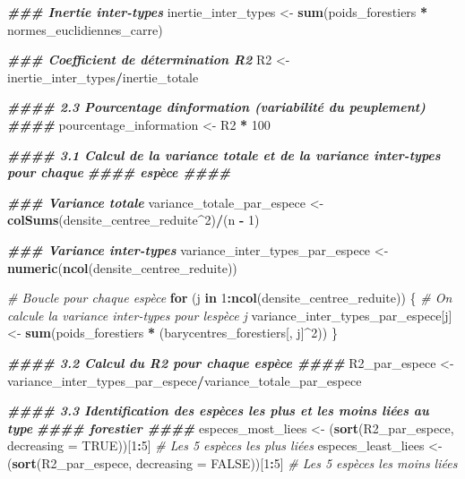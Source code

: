 \documentclass[
]{article}
\newenvironment{Shaded}{\begin{snugshade}}{\end{snugshade}}
\newcommand{\AttributeTok}[1]{\textcolor[rgb]{0.13,0.29,0.53}{#1}}
\newcommand{\CommentTok}[1]{\textcolor[rgb]{0.56,0.35,0.01}{\textit{#1}}}
\newcommand{\ConstantTok}[1]{\textcolor[rgb]{0.56,0.35,0.01}{#1}}
\newcommand{\ControlFlowTok}[1]{\textcolor[rgb]{0.13,0.29,0.53}{\textbf{#1}}}
\newcommand{\DecValTok}[1]{\textcolor[rgb]{0.00,0.00,0.81}{#1}}
\newcommand{\DocumentationTok}[1]{\textcolor[rgb]{0.56,0.35,0.01}{\textbf{\textit{#1}}}}
\newcommand{\FunctionTok}[1]{\textcolor[rgb]{0.13,0.29,0.53}{\textbf{#1}}}
\newcommand{\NormalTok}[1]{#1}
\newcommand{\OtherTok}[1]{\textcolor[rgb]{0.56,0.35,0.01}{#1}}
\newcommand{\SpecialCharTok}[1]{\textcolor[rgb]{0.81,0.36,0.00}{\textbf{#1}}}
\begin{document}
\begin{Shaded}
\begin{Highlighting}[]
\DocumentationTok{\#\#\# Inertie inter{-}types}
\NormalTok{inertie\_inter\_types }\OtherTok{\textless{}{-}} \FunctionTok{sum}\NormalTok{(poids\_forestiers }\SpecialCharTok{*}\NormalTok{ normes\_euclidiennes\_carre)}

\DocumentationTok{\#\#\# Coefficient de détermination R2}
\NormalTok{R2 }\OtherTok{\textless{}{-}}\NormalTok{ inertie\_inter\_types}\SpecialCharTok{/}\NormalTok{inertie\_totale}

\DocumentationTok{\#\#\#\# 2.3 Pourcentage d\textquotesingle{}information (variabilité du peuplement) \#\#\#\#}
\NormalTok{pourcentage\_information }\OtherTok{\textless{}{-}}\NormalTok{ R2 }\SpecialCharTok{*} \DecValTok{100}

\DocumentationTok{\#\#\#\# 3.1 Calcul de la variance totale et de la variance inter{-}types pour chaque}
\DocumentationTok{\#\#\#\# espèce \#\#\#\#}

\DocumentationTok{\#\#\# Variance totale}
\NormalTok{variance\_totale\_par\_espece }\OtherTok{\textless{}{-}} \FunctionTok{colSums}\NormalTok{(densite\_centree\_reduite}\SpecialCharTok{\^{}}\DecValTok{2}\NormalTok{)}\SpecialCharTok{/}\NormalTok{(n }\SpecialCharTok{{-}} \DecValTok{1}\NormalTok{)}

\DocumentationTok{\#\#\# Variance inter{-}types}
\NormalTok{variance\_inter\_types\_par\_espece }\OtherTok{\textless{}{-}} \FunctionTok{numeric}\NormalTok{(}\FunctionTok{ncol}\NormalTok{(densite\_centree\_reduite))}

\CommentTok{\# Boucle pour chaque espèce}
\ControlFlowTok{for}\NormalTok{ (j }\ControlFlowTok{in} \DecValTok{1}\SpecialCharTok{:}\FunctionTok{ncol}\NormalTok{(densite\_centree\_reduite)) \{}
    \CommentTok{\# On calcule la variance inter{-}types pour l\textquotesingle{}espèce j}
\NormalTok{    variance\_inter\_types\_par\_espece[j] }\OtherTok{\textless{}{-}} \FunctionTok{sum}\NormalTok{(poids\_forestiers }\SpecialCharTok{*}\NormalTok{ (barycentres\_forestiers[,}
\NormalTok{        j]}\SpecialCharTok{\^{}}\DecValTok{2}\NormalTok{))}
\NormalTok{\}}

\DocumentationTok{\#\#\#\# 3.2 Calcul du R2 pour chaque espèce \#\#\#\#}
\NormalTok{R2\_par\_espece }\OtherTok{\textless{}{-}}\NormalTok{ variance\_inter\_types\_par\_espece}\SpecialCharTok{/}\NormalTok{variance\_totale\_par\_espece}

\DocumentationTok{\#\#\#\# 3.3 Identification des espèces les plus et les moins liées au type}
\DocumentationTok{\#\#\#\# forestier \#\#\#\#}
\NormalTok{especes\_most\_liees }\OtherTok{\textless{}{-}}\NormalTok{ (}\FunctionTok{sort}\NormalTok{(R2\_par\_espece, }\AttributeTok{decreasing =} \ConstantTok{TRUE}\NormalTok{))[}\DecValTok{1}\SpecialCharTok{:}\DecValTok{5}\NormalTok{]  }\CommentTok{\# Les 5 espèces les plus liées}
\NormalTok{especes\_least\_liees }\OtherTok{\textless{}{-}}\NormalTok{ (}\FunctionTok{sort}\NormalTok{(R2\_par\_espece, }\AttributeTok{decreasing =} \ConstantTok{FALSE}\NormalTok{))[}\DecValTok{1}\SpecialCharTok{:}\DecValTok{5}\NormalTok{]  }\CommentTok{\# Les 5 espèces les moins liées}


\end{Highlighting}
\end{Shaded}
\end{document}
